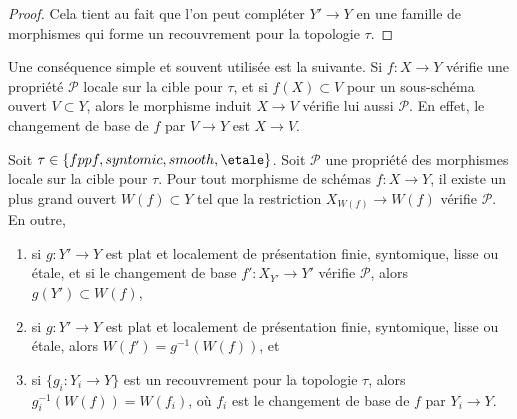 \begin{proof}
Cela tient au fait que l'on peut compléter $Y' \to Y$ en une famille de
morphismes qui forme un recouvrement pour la topologie $\tau$.
\end{proof}

\noindent
Une conséquence simple et souvent utilisée est la suivante. Si
$f : X \to Y$ vérifie une propriété $\mathcal{P}$ locale sur la cible pour
$\tau$, et si $f(X) \subset V$ pour un sous-schéma ouvert $V \subset Y$,
alors le morphisme induit $X \to V$ vérifie lui aussi $\mathcal{P}$.
En effet, le changement de base de $f$ par $V \to Y$ est $X \to V$.

\begin{lemma}
\label{lemma-largest-open-of-the-base}
Soit $\tau \in \{fppf, syntomic, smooth, \etale\}$. Soit $\mathcal{P}$ une
propriété des morphismes locale sur la cible pour $\tau$. Pour tout morphisme
de schémas $f : X \to Y$, il existe un plus grand ouvert $W(f) \subset Y$
tel que la restriction $X_{W(f)} \to W(f)$ vérifie $\mathcal{P}$. En outre,
\begin{enumerate}
\item si $g : Y' \to Y$ est plat et localement de présentation finie,
syntomique, lisse ou \'etale, et si le changement de base
$f' : X_{Y'} \to Y'$ vérifie $\mathcal{P}$, alors $g(Y') \subset W(f)$,
\item si $g : Y' \to Y$ est plat et localement de présentation finie,
syntomique, lisse ou \'etale, alors $W(f') = g^{-1}(W(f))$, et
\item si $\{g_i : Y_i \to Y\}$ est un recouvrement pour la topologie $\tau$,
alors $g_i^{-1}(W(f)) = W(f_i)$, où $f_i$ est le changement de base de $f$
par $Y_i \to Y$.
\end{enumerate}
\end{lemma}

